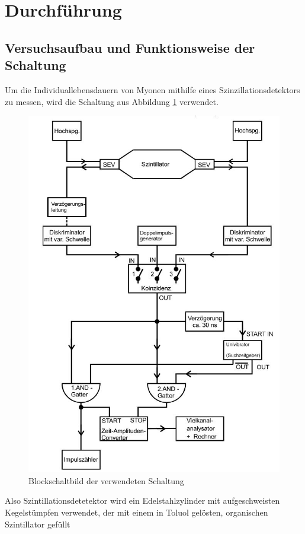 \section{Durchführung}
\label{sec:Durchführung}
\subsection{Versuchsaufbau und Funktionsweise der Schaltung}
\label{sub:aufbau}
Um die Individuallebensdauern von Myonen mithilfe eines Szinzillationsdetektors zu messen, wird die Schaltung aus Abbildung \ref{fig:schaltung} verwendet.
\begin{figure}[H]
  \centering
  \includegraphics{./content/blockschaltbild.JPG}
  \caption{Blockschaltbild der verwendeten Schaltung}
  \label{fig:schaltung}
\end{figure}
Also Szintillationsdetetektor wird ein Edelstahlzylinder mit aufgeschweisten Kegelstümpfen verwendet, der mit einem in Toluol gelösten, organischen Szintillator gefüllt
